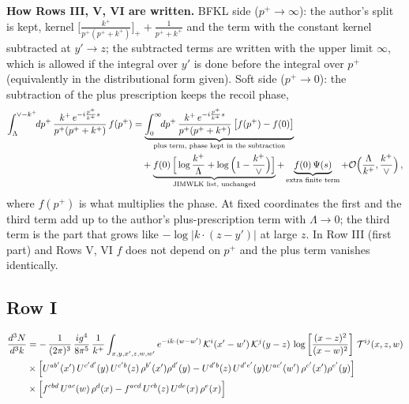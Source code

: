 \documentclass[9pt]{article}
\numberwithin{equation}{section}
\begin{document}
\noindent\textbf{How Rows III, V, VI are written.} BFKL side ($p^{+}\to\infty$): the author's split is kept, kernel $\big[\frac{k^{+}}{p^{+}(p^{+}+k^{+})}\big]_{+}+\frac{1}{p^{+}+k^{+}}$ and the term with the constant kernel subtracted at $y'\to z$; the subtracted terms are written with the upper limit $\infty$, which is allowed if the integral over $y'$ is done before the integral over $p^{+}$ (equivalently in the distributional form given). Soft side ($p^{+}\to0$): the subtraction of the plus prescription keeps the recoil phase,
\begin{align}
\int_{\Lambda}^{\vee-k^{+}}\!\!dp^{+}\,\frac{k^{+}\,e^{-i\frac{p^{+}}{k^{+}}s}}{p^{+}(p^{+}+k^{+})}\,f(p^{+})
& =\underbrace{\int_{0}^{\infty}\!\!dp^{+}\,\frac{k^{+}\,e^{-i\frac{p^{+}}{k^{+}}s}}{p^{+}(p^{+}+k^{+})}\,\big[f(p^{+})-f(0)\big]}_{\text{plus term, phase kept in the subtraction}}\notag\\ & \quad
+\underbrace{f(0)\,\Big[\log\frac{k^{+}}{\Lambda}+\log\Big(1-\frac{k^{+}}{\vee}\Big)\Big]}_{\text{JIMWLK list, unchanged}}
+\underbrace{f(0)\,\Psi(s)}_{\text{extra finite term}}+{\cal O}\Big(\frac{\Lambda}{k^{+}},\frac{k^{+}}{\vee}\Big)\,,\notag
\end{align}
where $f(p^{+})$ is what multiplies the phase. At fixed coordinates the first and the third term add up to the author's plus-prescription term with $\Lambda\to0$; the third term is the part that grows like $-\log|k\cdot(z-y')|$ at large $z$. In Row III (first part) and Rows V, VI $f$ does not depend on $p^{+}$ and the plus term vanishes identically.
\subsection{Row I}
\begin{align}
     \frac{d^{3}N}{d^{3}k}  & =  -\,\frac{1}{(2\pi)^{3}}\,\frac{ig^{4}}{8\pi^{5}}\,\frac{1}{k^{+}} \int_{x,y,x',z,w,w^{\prime}} e^{-ik\cdot(w-w^{\prime})}\,\mathcal{K}^{i}(x'-w')\,\mathcal{K}^{j}(y-z)\,\log\left[\frac{(x-z)^{2}}{(x-w)^{2}}\right]\,\mathcal{T}^{ij}(x,z,w)\notag \\
& \times \Big[U^{ab'}(x')\,U^{c'd'}(y)\,U^{c'b}(z)\,\rho^{b'}(x')\rho^{d'}(y)-U^{d'b}(z)\,U^{d'e'}(y)U^{ac'}(w')\,\rho^{c'}(x')\rho^{e'}(y)\Big]\notag \\ & \times\Big[f^{cbd}\,U^{ac}(w)\,\rho^{d}(x)-f^{acd}\, U^{cb}(z)\,U^{de}(x)\,\rho^{e}(x)\Big]
\end{align}
\end{document}
